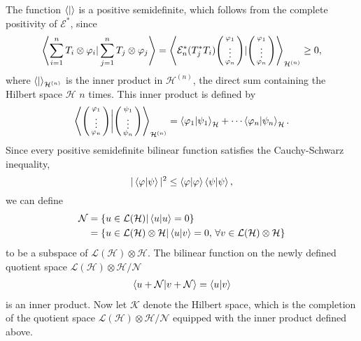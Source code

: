 \documentclass[a4paper,12pt]{wihuri}
\theoremstyle{definition}
\numberwithin{definition}{section}
\numberwithin{example}{section}
\numberwithin{theorem}{section}
\numberwithin{proposition}{section}
\numberwithin{lemma}{section}
\newcommand{\hi}{\mathcal{H}}%
\newcommand{\ki}{\mathcal{K}}%
\newcommand{\lin}{\mathcal{L}}%
\newcommand{\EC}{\mathcal{E}}
\newenvironment{psmallmatrix}
  {\left(\begin{smallmatrix}}
  {\end{smallmatrix}\right)}
\begin{document}
The function $\braket{|}$ is a positive semidefinite, which follows from the complete positivity of $\EC^*$, since
\begin{align*}
\left\langle\sum_{i=1}^n T_i \otimes \varphi_i|\sum_{j=1}^n T_j \otimes \varphi_j\right\rangle = \left\langle \EC_n^*(T_j^*T_i)\begin{psmallmatrix}
\varphi_1 \\
\vdots \\
\varphi_n
\end{psmallmatrix} | \begin{psmallmatrix}
\varphi_1 \\
\vdots \\
\varphi_n
\end{psmallmatrix} \right\rangle_{\hi^{(n)}} \geq 0,
\end{align*}
where $\braket{|}_{\hi^{(n)}}$ is the inner product in $\hi^{(n)}$, the direct sum containing the Hilbert space $\hi$ $n$ times. This inner product is defined by
\begin{align*}
\left\langle \begin{psmallmatrix}
\varphi_1\\
\vdots \\
\varphi_n
\end{psmallmatrix} \bigg| \begin{psmallmatrix}
\psi_1 \\
\vdots \\
\psi_n
\end{psmallmatrix} \right\rangle_{\hi^{(n)}} = \braket{\varphi_1 | \psi_1}_{\hi} + \cdots \braket{\varphi_n | \psi_n}_{\hi}\text{.} 
\end{align*}
Since every positive semidefinite bilinear function satisfies the Cauchy-Schwarz inequality, 
\begin{equation}\label{CS}
|\braket{\varphi | \psi}|^2 \leq \braket{\varphi | \varphi}\braket{\psi | \psi},
\end{equation}
we can define
\begin{align*}
\mathcal{N} &= \lbrace u \in \lin(\hi) | \braket{u | u} = 0 \rbrace \\
&=\lbrace u \in \lin(\hi) \otimes \hi | \braket{u | v} = 0, \, \forall v \in \lin(\hi) \otimes \hi \rbrace
\end{align*}
to be a subspace of $\lin(\hi) \otimes \hi$. The bilinear function on the newly defined quotient space $\lin(\hi) \otimes \hi / \mathcal{N}$
\begin{align*}
\braket{u + \mathcal{N} |v + \mathcal{N}} = \braket{u|v}
\end{align*}
is an inner product. Now let $\ki$ denote the Hilbert space, which is the completion of the quotient space $\lin(\hi) \otimes \hi / \mathcal{N}$ equipped with the inner product defined above.
\end{document}
